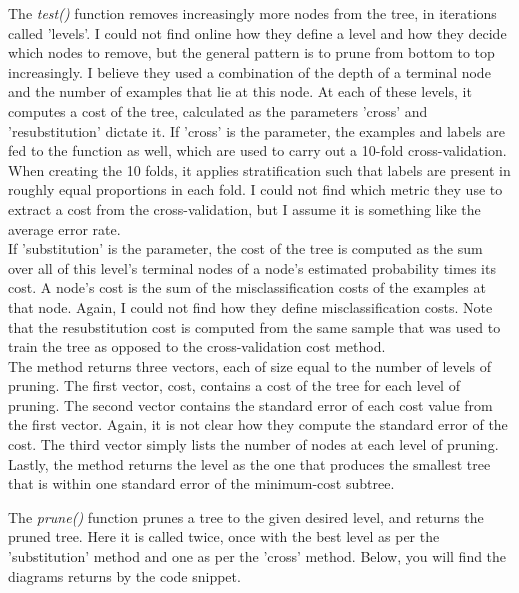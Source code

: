 The \emph{test()} function removes increasingly more nodes from the tree, in iterations called 'levels'.
I could not find online how they define a level and how they decide which nodes to remove,
but the general pattern is to prune from bottom to top increasingly.
I believe they used a combination of the depth of a terminal node and the number of examples that lie at this node.
At each of these levels, it computes a cost of the tree, calculated as the parameters 'cross' and 'resubstitution' dictate it.
If 'cross' is the parameter, the examples and labels are fed to the function as well, which are used to carry out a 10-fold
cross-validation. When creating the 10 folds, it applies stratification such that labels are present in roughly equal proportions
in each fold. I could not find which metric they use to extract a cost from the cross-validation, but I assume it is something
like the average error rate.\\
If 'substitution' is the parameter, the cost of the tree is computed as the sum over all of this level's terminal
nodes of a node's estimated probability times its cost.
A node's cost is the sum of the misclassification costs of the examples at that node.
Again, I could not find how they define misclassification costs.
Note that the resubstitution cost is computed from the same sample that was used to train the tree as opposed to the cross-validation
cost method.\\
The method returns three vectors, each of size equal to the number of levels of pruning. The first vector, cost, contains a cost
of the tree for each level of pruning. The second vector contains the standard error of each cost value from the first vector.
Again, it is not clear how they compute the standard error of the cost. The third vector simply lists the number of nodes at each
level of pruning. Lastly, the method returns the level as the one that produces the smallest tree that is within one standard
error of the minimum-cost subtree.

The \emph{prune()} function prunes a tree to the given desired level, and returns the pruned tree.
Here it is called twice, once with the best level as per the 'substitution' method and one as per the 'cross' method.
Below, you will find the diagrams returns by the code snippet.



